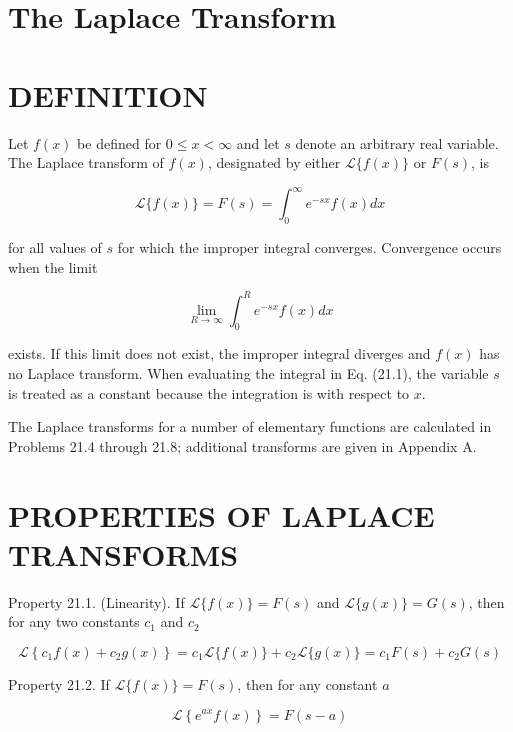 \documentclass[10pt]{article}
\begin{document}
\section*{The Laplace Transform}
\section*{DEFINITION}
Let $f(x)$ be defined for $0 \leq x<\infty$ and let $s$ denote an arbitrary real variable. The Laplace transform of $f(x)$, designated by either $\mathscr{L}\{f(x)\}$ or $F(s)$, is


\begin{equation*}
\mathscr{L}\{f(x)\}=F(s)=\int_{0}^{\infty} e^{-s x} f(x) d x \tag{21.1}
\end{equation*}


for all values of $s$ for which the improper integral converges. Convergence occurs when the limit


\begin{equation*}
\lim _{R \rightarrow \infty} \int_{0}^{R} e^{-s x} f(x) d x \tag{21.2}
\end{equation*}


exists. If this limit does not exist, the improper integral diverges and $f(x)$ has no Laplace transform. When evaluating the integral in Eq. (21.1), the variable $s$ is treated as a constant because the integration is with respect to $x$.

The Laplace transforms for a number of elementary functions are calculated in Problems 21.4 through 21.8; additional transforms are given in Appendix A.

\section*{PROPERTIES OF LAPLACE TRANSFORMS}
Property 21.1. (Linearity). If $\mathscr{L}\{f(x)\}=F(s)$ and $\mathscr{L}\{g(x)\}=G(s)$, then for any two constants $c_{1}$ and $c_{2}$


\begin{equation*}
\mathscr{L}\left\{c_{1} f(x)+c_{2} g(x)\right\}=c_{1} \mathscr{L}\{f(x)\}+c_{2} \mathscr{L}\{g(x)\}=c_{1} F(s)+c_{2} G(s) \tag{21.3}
\end{equation*}


Property 21.2. If $\mathscr{L}\{f(x)\}=F(s)$, then for any constant $a$


\begin{equation*}
\mathscr{L}\left\{e^{a x} f(x)\right\}=F(s-a) \tag{21.4}
\end{equation*}
\end{document}
